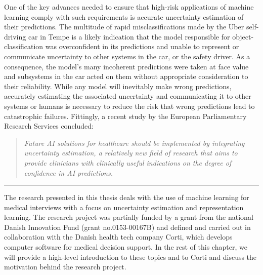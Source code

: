 One of the key advances needed to ensure that high-risk applications of machine learning comply with such requirements is accurate uncertainty estimation of their predictions. 
The multitude of rapid misclassifications made by the Uber self-driving car in Tempe is a likely indication that the model responsible for object-classification was overconfident in its predictions and unable to represent or communicate uncertainty to other systems in the car, or the safety driver. 
As a consequence, the model's many incoherent predictions were taken at face value and subsystems in the car acted on them without appropriate consideration to their reliability.
While any model will inevitably make wrong predictions, accurately estimating the associated uncertainty and communicating it to other systems or humans is necessary to reduce the risk that wrong predictions lead to catastrophic failures. 
Fittingly, a recent study by the European Parliamentary Research Services \parencite{europeanparliament_artificial_2022} concluded: 
%
\begin{quote}
    \centering\itshape
    Future AI solutions for healthcare should be implemented by integrating uncertainty estimation, a relatively new field of research that aims to provide clinicians with clinically useful indications on the degree of confidence in AI predictions.
\end{quote}
\begin{center}
\noindent\rule{0.2\textwidth}{0.5pt}
\end{center}
\vspace{1em}
%
%
\noindent The research presented in this thesis deals with the use of machine learning for medical interviews with a focus on uncertainty estimation and representation learning. 
The research project was partially funded by a grant from the national Danish Innovation Fund (grant no.\@ 0153-00167B) and defined and carried out in collaboration with the Danish health tech company Corti, which develops computer software for medical decision support. 
In the rest of this chapter, we will provide a high-level introduction to these topics and to Corti and discuss the motivation behind the research project.


